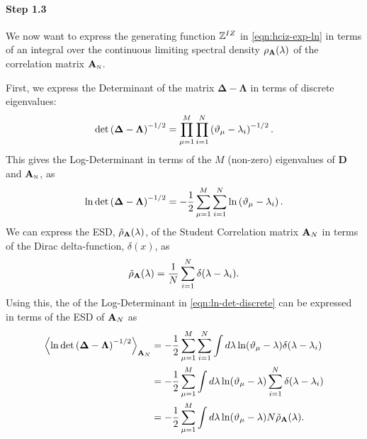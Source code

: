\paragraph{Step 1.3}
We now want to express
the generating function $\mathbb{Z}^{IZ}$ 
in \ref{eqn:hciz-exp-ln}
in terms of an integral over the continuous limiting spectral density
$\rho_{\mathbf{A}}(\lambda)$ of the correlation matrix ${\mathbf{A}}_{\text{\tiny N}}$.  

First, we express the Determinant of the matrix $\mathbf{\Delta}-\mathbf{\Lambda}$ in terms of discrete eigenvalues:
\begin{equation}
\label{eqn:det-discrete}
    \det\left(\mathbf{\Delta}-\mathbf{\Lambda}\right)^{-1/2}=\prod_{\mu=1}^{M}\prod_{i=1}^{N}\left(\DeltaMu-\lambda_{i}\right)^{-1/2}  .
\end{equation}
%
This gives the Log-Determinant in terms of the $M$ (non-zero)
eigenvalues of $\mathbf{D}$ and ${\mathbf{A}}_{\text{\tiny N}}$, as
\begin{equation}
\label{eqn:ln-det-discrete}
    \ln\det\left(\mathbf{\Delta}-\mathbf{\Lambda}\right)^{-1/2}=-\dfrac{1}{2}\sum_{\mu=1}^{M}\sum_{i=1}^{N}\ln\left(\DeltaMu-\lambda_{i}\right)  .
\end{equation}
%
We can express %
the ESD, $\tilde\rho_{\mathbf{A}}(\lambda)$, of the 
Student Correlation 
matrix
$\mathbf{A}_N$ in terms of the Dirac delta-function, $\delta(x)$, as
\begin{equation}
\label{eqn:rho-emp}
    \tilde\rho_{\AMAT}(\lambda)=\frac{1}{N}\sum_{i=1}^{N}\delta(\lambda-\lambda_{i})  .
\end{equation}
Using this, the \ExpectedValue of the Log-Determinant 
in \ref{eqn:ln-det-discrete}
can be expressed in terms of the ESD of
$\mathbf{A}_N$ as
\begin{align}
\nonumber
\Expected[\AMAT_N]{\ln\det\left(\mathbf{\Delta}-\mathbf{\Lambda}\right)^{-1/2}}
   & = -\dfrac{1}{2}\sum_{\mu=1}^{M}\sum_{i=1}^{N}\int
       d\lambda\ln(\DeltaMu-\lambda)\delta(\lambda-\lambda_{i}) \\ 
\nonumber
   & = -\dfrac{1}{2}\sum_{\mu=1}^{M}\int
       d\lambda\ln(\DeltaMu-\lambda)\sum_{i=1}^{N}\delta(\lambda-\lambda_{i}) \\ 
\label{eqn:ln-det-rho}
   & = -\dfrac{1}{2}\sum_{\mu=1}^{M}\int
       d\lambda\ln(\DeltaMu-\lambda)
       N\tilde\rho_{\AMAT}(\lambda)  .
\end{align}

